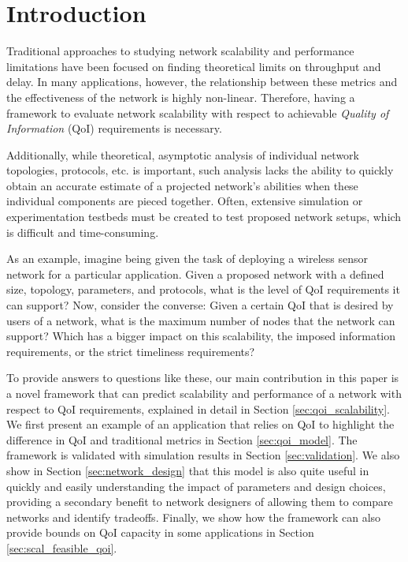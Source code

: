 \section{Introduction}
\label{sec:intro}


Traditional approaches to studying network scalability and performance limitations have been focused on finding theoretical limits on throughput and delay.  In many applications, however, the relationship between these metrics and the effectiveness of the network is highly non-linear.  Therefore, having a framework to evaluate network scalability with respect to achievable \emph{Quality of Information} (QoI) requirements is necessary.

Additionally, while theoretical, asymptotic analysis of individual network topologies, protocols, etc. is important, such analysis lacks the ability to quickly obtain an accurate estimate of a projected network's abilities when these individual components are pieced together.  Often, extensive simulation or experimentation testbeds must be created to test proposed network setups, which is difficult and time-consuming.  

As an example, imagine being given the task of deploying a wireless sensor network for a particular application.  Given a proposed network with a defined size, topology, parameters, and protocols, what is the level of QoI requirements it can support?  Now, consider the converse:  Given a certain QoI that is desired by users of a network, what is the maximum number of nodes that the network can support?  Which has a bigger impact on this scalability, the imposed information requirements, or the strict timeliness requirements?

To provide answers to questions like these, our main contribution in this paper is a novel framework that can predict scalability and performance of a network with respect to QoI requirements, explained in detail in Section \ref{sec:qoi_scalability}.  We first present an example of an application that relies on QoI to highlight the difference in QoI and traditional metrics in Section \ref{sec:qoi_model}.  The framework is validated with simulation results in Section \ref{sec:validation}.  We also show in Section \ref{sec:network_design} that this model is also quite useful in quickly and easily understanding the impact of parameters and design choices, providing a secondary benefit to network designers of allowing them to compare networks and identify tradeoffs.  Finally, we show how the framework can also provide bounds on QoI capacity in some applications in Section \ref{sec:scal_feasible_qoi}.

